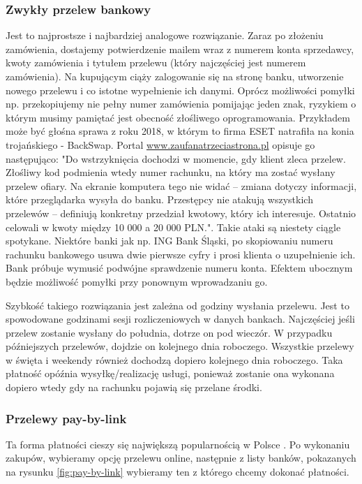 \documentclass[12pt]{article}
\numberwithin{figure}{section}
\begin{document}
\subsubsection{Zwykły przelew bankowy}
Jest to najprostsze i najbardziej analogowe rozwiązanie. Zaraz po złożeniu zamówienia, dostajemy potwierdzenie mailem wraz z numerem konta sprzedawcy, kwoty zamówienia i tytułem przelewu (który najczęściej jest numerem zamówienia). Na kupującym ciąży zalogowanie się na stronę banku, utworzenie nowego przelewu i co istotne wypełnienie ich danymi. Oprócz możliwości pomyłki np. przekopiujemy nie pełny numer zamówienia pomijając jeden znak, ryzykiem o którym musimy pamiętać jest obecność złośliwego oprogramowania. Przykładem może być głośna sprawa z roku 2018, w którym to firma ESET natrafiła na konia trojańskiego - BackSwap. Portal \url{www.zaufanatrzeciastrona.pl} opisuje go następująco: "Do wstrzyknięcia dochodzi w momencie, gdy klient zleca przelew. Złośliwy kod podmienia wtedy numer rachunku, na który ma zostać wysłany przelew ofiary. Na ekranie komputera tego nie widać – zmiana dotyczy informacji, które przeglądarka wysyła do banku. Przestępcy nie atakują wszystkich przelewów – definiują konkretny przedział kwotowy, który ich interesuje. Ostatnio celowali w kwoty między 10 000 a 20 000 PLN."\cite{backswap}.
Takie ataki są niestety ciągle spotykane. Niektóre banki jak np. ING Bank Śląski, po skopiowaniu numeru rachunku bankowego usuwa dwie pierwsze cyfry i prosi klienta o uzupełnienie ich. Bank próbuje wymusić podwójne sprawdzenie numeru konta. Efektem ubocznym będzie możliwość pomyłki przy ponownym wprowadzaniu go.

Szybkość takiego rozwiązania jest zależna od godziny wysłania przelewu. Jest to spowodowane godzinami sesji rozliczeniowych w danych bankach. Najczęściej jeśli przelew zostanie wysłany do południa, dotrze on pod wieczór. W przypadku późniejszych przelewów, dojdzie on kolejnego dnia roboczego. Wszystkie przelewy w święta i weekendy również dochodzą dopiero kolejnego dnia roboczego. Taka płatność opóźnia wysyłkę/realizację usługi, ponieważ zostanie ona wykonana dopiero wtedy gdy na rachunku pojawią się przelane środki. 

\subsubsection{Przelewy pay-by-link}
Ta forma płatności cieszy się największą popularnością w Polsce \cite{jak-placa-polacy}. Po wykonaniu zakupów, wybieramy opcję przelewu online, następnie z listy banków, pokazanych na rysunku \ref{fig:pay-by-link} wybieramy ten z którego chcemy dokonać płatności. 
\end{document}
